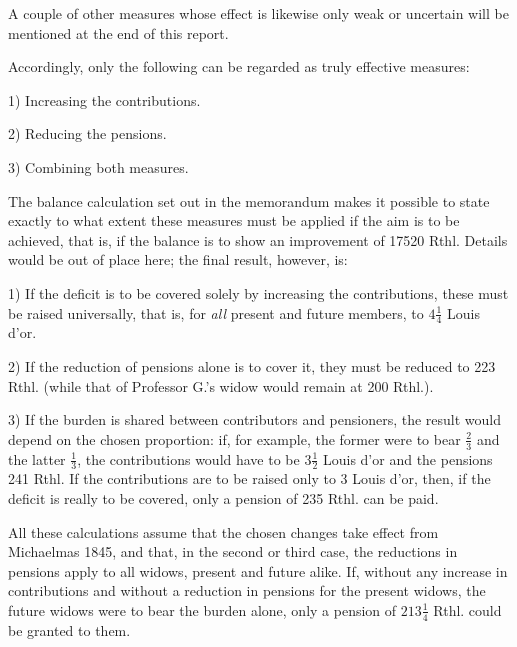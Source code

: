 A couple of other measures whose effect is likewise only weak or uncertain will be mentioned at the end of this report.

Accordingly, only the following can be regarded as truly effective measures:

1) Increasing the contributions.

2) Reducing the pensions.

3) Combining both measures.

The balance calculation set out in the memorandum makes it possible to state exactly to what extent these measures must be applied if the aim is to be achieved, that is, if the balance is to show an improvement of 17520 Rthl. Details would be out of place here; the final result, however, is:

1) If the deficit is to be covered solely by increasing the contributions, these must be raised universally, that is, for \textit{all} present and future members, to \(4\tfrac{1}{4}\) Louis d'or.

2) If the reduction of pensions alone is to cover it, they must be reduced to 223 Rthl. (while that of Professor G.'s widow would remain at 200 Rthl.).

3) If the burden is shared between contributors and pensioners, the result would depend on the chosen proportion: if, for example, the former were to bear \(\tfrac{2}{3}\) and the latter \(\tfrac{1}{3}\), the contributions would have to be \(3\tfrac{1}{2}\) Louis d'or and the pensions 241 Rthl. If the contributions are to be raised only to 3 Louis d'or, then, if the deficit is really to be covered, only a pension of 235 Rthl. can be paid.

All these calculations assume that the chosen changes take effect from Michaelmas 1845, and that, in the second or third case, the reductions in pensions apply to all widows, present and future alike. If, without any increase in contributions and without a reduction in pensions for the present widows, the future widows were to bear the burden alone, only a pension of \(213\tfrac{1}{4}\) Rthl. could be granted to them.

